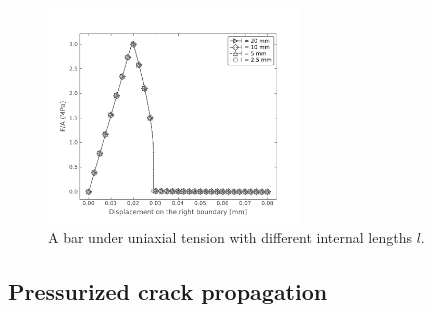 \begin{figure}[!ht]
  \centering
  \includegraphics[width=0.6\textwidth]{Chapter3/figures/bar_length}
  \caption{A bar under uniaxial tension with different internal lengths $l$.}
  \label{fig:bar_length}
\end{figure}

\subsection{Pressurized crack propagation}

